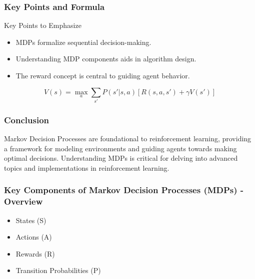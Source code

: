 \documentclass[aspectratio=169]{beamer}
\begin{document}
\begin{frame}[fragile]
    \frametitle{Key Points and Formula}
    \begin{block}{Key Points to Emphasize}
        \begin{itemize}
            \item MDPs formalize sequential decision-making.
            \item Understanding MDP components aids in algorithm design.
            \item The reward concept is central to guiding agent behavior.
        \end{itemize}
    \end{block}

    \begin{equation}
        V(s) = \max_{a} \sum_{s'} P(s' | s, a) [R(s, a, s') + \gamma V(s')]
    \end{equation}    
\end{frame}

\begin{frame}[fragile]
    \frametitle{Conclusion}
    Markov Decision Processes are foundational to reinforcement learning, providing a framework for modeling environments and guiding agents towards making optimal decisions. Understanding MDPs is critical for delving into advanced topics and implementations in reinforcement learning.
\end{frame}

\begin{frame}[fragile]
    \frametitle{Key Components of Markov Decision Processes (MDPs) - Overview}
    \begin{itemize}
        \item States (S)
        \item Actions (A)
        \item Rewards (R)
        \item Transition Probabilities (P)
    \end{itemize}
\end{frame}
\end{document}
